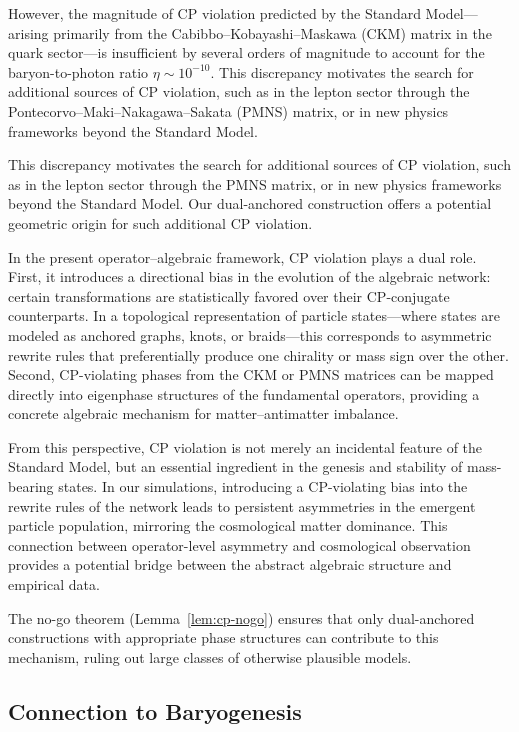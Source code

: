 \documentclass[11pt]{article}
\theoremstyle{plain}
\theoremstyle{definition}
\begin{document}
However, the magnitude of CP violation predicted by the Standard Model---arising primarily from the Cabibbo–Kobayashi–Maskawa (CKM) matrix in the quark sector---is insufficient by several orders of magnitude to account for the baryon-to-photon ratio $\eta \sim 10^{-10}$. This discrepancy motivates the search for additional sources of CP violation, such as in the lepton sector through the Pontecorvo–Maki–Nakagawa–Sakata (PMNS) matrix, or in new physics frameworks beyond the Standard Model.

This discrepancy motivates the search for additional sources of CP violation, such as in the lepton sector through the PMNS matrix, or in new physics frameworks beyond the Standard Model. Our dual-anchored construction offers a potential geometric origin for such additional CP violation.

In the present operator–algebraic framework, CP violation plays a dual role. First, it introduces a directional bias in the evolution of the algebraic network: certain transformations are statistically favored over their CP-conjugate counterparts. In a topological representation of particle states---where states are modeled as anchored graphs, knots, or braids---this corresponds to asymmetric rewrite rules that preferentially produce one chirality or mass sign over the other. Second, CP-violating phases from the CKM or PMNS matrices can be mapped directly into eigenphase structures of the fundamental operators, providing a concrete algebraic mechanism for matter–antimatter imbalance.

From this perspective, CP violation is not merely an incidental feature of the Standard Model, but an essential ingredient in the genesis and stability of mass-bearing states. In our simulations, introducing a CP-violating bias into the rewrite rules of the network leads to persistent asymmetries in the emergent particle population, mirroring the cosmological matter dominance. This connection between operator-level asymmetry and cosmological observation provides a potential bridge between the abstract algebraic structure and empirical data.

The no-go theorem (Lemma~\ref{lem:cp-nogo}) ensures that only dual-anchored constructions with appropriate phase structures can contribute to this mechanism, ruling out large classes of otherwise plausible models.

\subsection{Connection to Baryogenesis}
\end{document}
